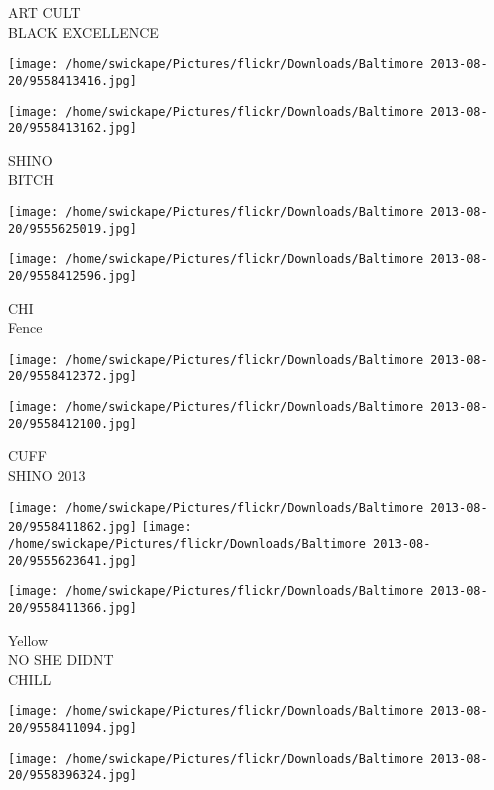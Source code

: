 \documentclass[10pt,letterpaper]{article}
\begin{document}
ART CULT\\
BLACK EXCELLENCE\\
\pagebreak

\texttt{[image: /home/swickape/Pictures/flickr/Downloads/Baltimore 2013-08-20/9558413416.jpg]}

\vspace{0.25in}
\texttt{[image: /home/swickape/Pictures/flickr/Downloads/Baltimore 2013-08-20/9558413162.jpg]}

SHINO\\
BITCH\\
\pagebreak

\texttt{[image: /home/swickape/Pictures/flickr/Downloads/Baltimore 2013-08-20/9555625019.jpg]}

\vspace{0.25in}
\texttt{[image: /home/swickape/Pictures/flickr/Downloads/Baltimore 2013-08-20/9558412596.jpg]}

CHI\\
Fence\\
\pagebreak

\texttt{[image: /home/swickape/Pictures/flickr/Downloads/Baltimore 2013-08-20/9558412372.jpg]}

\vspace{0.25in}
\texttt{[image: /home/swickape/Pictures/flickr/Downloads/Baltimore 2013-08-20/9558412100.jpg]}

CUFF\\
SHINO 2013\\
\pagebreak

\texttt{[image: /home/swickape/Pictures/flickr/Downloads/Baltimore 2013-08-20/9558411862.jpg]}
\texttt{[image: /home/swickape/Pictures/flickr/Downloads/Baltimore 2013-08-20/9555623641.jpg]}

\vspace{0.25in}
\texttt{[image: /home/swickape/Pictures/flickr/Downloads/Baltimore 2013-08-20/9558411366.jpg]}

Yellow\\
NO SHE DIDNT\\
CHILL\\
\pagebreak

\texttt{[image: /home/swickape/Pictures/flickr/Downloads/Baltimore 2013-08-20/9558411094.jpg]}

\vspace{0.25in}
\texttt{[image: /home/swickape/Pictures/flickr/Downloads/Baltimore 2013-08-20/9558396324.jpg]}
\end{document}
